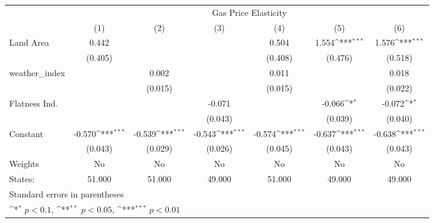 {
\def\sym#1{\ifmmode^{#1}\else\(^{#1}\)\fi}
\begin{tabular}{l*{6}{c}}
\hline\hline
            &\multicolumn{6}{c}{Gas Price Elasticity}                                                                                           \\
            &\multicolumn{1}{c}{(1)}         &\multicolumn{1}{c}{(2)}         &\multicolumn{1}{c}{(3)}         &\multicolumn{1}{c}{(4)}         &\multicolumn{1}{c}{(5)}         &\multicolumn{1}{c}{(6)}         \\
\hline
Land Area   &       0.442         &                     &                     &       0.504         &       1.554\sym{***}&       1.576\sym{***}\\
            &     (0.405)         &                     &                     &     (0.408)         &     (0.476)         &     (0.518)         \\
[1em]
weather\_index&                     &       0.002         &                     &       0.011         &                     &       0.018         \\
            &                     &     (0.015)         &                     &     (0.015)         &                     &     (0.022)         \\
[1em]
Flatness Ind.&                     &                     &      -0.071         &                     &      -0.066\sym{*}  &      -0.072\sym{*}  \\
            &                     &                     &     (0.043)         &                     &     (0.039)         &     (0.040)         \\
[1em]
Constant    &      -0.570\sym{***}&      -0.539\sym{***}&      -0.543\sym{***}&      -0.574\sym{***}&      -0.637\sym{***}&      -0.638\sym{***}\\
            &     (0.043)         &     (0.029)         &     (0.026)         &     (0.045)         &     (0.043)         &     (0.043)         \\
\hline
Weights     &          No         &          No         &          No         &          No         &          No         &          No         \\
States:     &      51.000         &      51.000         &      49.000         &      51.000         &      49.000         &      49.000         \\
\hline\hline
\multicolumn{7}{l}{\footnotesize Standard errors in parentheses}\\
\multicolumn{7}{l}{\footnotesize \sym{*} \(p<0.1\), \sym{**} \(p<0.05\), \sym{***} \(p<0.01\)}\\
\end{tabular}
}
